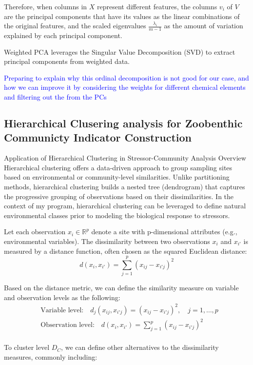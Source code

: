 Therefore, when columns in \(X\) represent different features, the columns \(v_i\) of \(V\) are the principal components 
that have its values as the linear combinations of the original features, and the scaled eigenvalues \(\frac{\lambda_i}{m-1}\)
as the amount of variation explained by each principal component.

Weighted PCA leverages the Singular Value Decomposition (SVD)
to extract principal components from weighted data.

\textcolor{blue}{Preparing to explain why this ordinal decomposition is not good for our case, and how we can 
improve it by considering the weights for different chemical elements and filtering out the from the PCs}

\subsection{Hierarchical Clusering analysis for Zoobenthic Communicty Indicator Construction}

Application of Hierarchical Clustering in Stressor-Community Analysis
Overview
Hierarchical clustering offers a data-driven approach to group sampling sites based on environmental or 
community-level similarities. Unlike partitioning methods, hierarchical clustering builds a nested tree
(dendrogram) that captures the progressive grouping of observations based on their dissimilarities.
In the context of my program, hierarchical clustering can be leveraged to define natural environmental 
classes prior to modeling the biological response to stressors.

Let each observation \( x_i \in \mathbb{R}^p \) denote a site with p-dimensional attributes (e.g., environmental variables). 
The dissimilarity between two observations \( x_i \) and \( x_{i'} \) is measured by a distance function,
often chosen as the squared Euclidean distance:
\[ d(x_i, x_{i'}) = \sum_{j=1}^p (x_{ij} - x_{i'j})^2 \]

Based on the distance metric, we can define the similarity measure on variable and observation levels as the following:
\[
\begin{aligned}
    &\text{Variable level:} \quad d_j(x_{ij}, x_{i'j}) = (x_{ij} - x_{i'j})^2, \quad j = 1, \ldots, p \\
    &\text{Observation level:} \quad d(x_i, x_{i'}) = \sum_{j=1}^{p} (x_{ij} - x_{i'j})^2 \\
\end{aligned}
\]

To cluster level \( D_C \), we can define other alternatives to the dissimilarity measures, commonly including:

